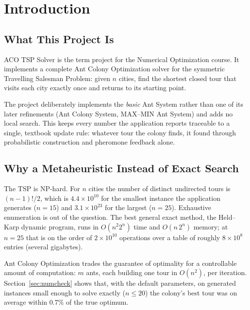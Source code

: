 \documentclass[11pt,a4paper]{article}
\begin{document}
\tableofcontents
\newpage

\section{Introduction}

\subsection{What This Project Is}
ACO TSP Solver is the term project for the Numerical Optimization course. It implements a complete
Ant Colony Optimization solver for the symmetric Travelling Salesman Problem: given $n$ cities, find the
shortest closed tour that visits each city exactly once and returns to its starting point.

The project deliberately implements the \emph{basic} Ant System rather than one of its later
refinements (Ant Colony System, MAX--MIN Ant System) and adds no local search. This keeps every number
the application reports traceable to a single, textbook update rule: whatever tour the colony finds, it
found through probabilistic construction and pheromone feedback alone.

\subsection{Why a Metaheuristic Instead of Exact Search}
The TSP is NP-hard. For $n$ cities the number of distinct undirected tours is $(n-1)!/2$, which is
$4.4\times10^{10}$ for the smallest instance the application generates ($n=15$) and $3.1\times10^{23}$ for
the largest ($n=25$). Exhaustive enumeration is out of the question. The best general exact method, the
Held--Karp dynamic program, runs in $O(n^2 2^n)$ time and $O(n\,2^n)$ memory; at $n=25$ that is on the
order of $2\times10^{10}$ operations over a table of roughly $8\times10^{8}$ entries (several gigabytes).

Ant Colony Optimization trades the guarantee of optimality for a controllable amount of computation:
$m$ ants, each building one tour in $O(n^2)$, per iteration. Section~\ref{sec:numcheck} shows that, with the
default parameters, on generated instances small enough to solve exactly ($n\le20$) the colony's best tour
was on average within 0.7\% of the true optimum.
\end{document}
